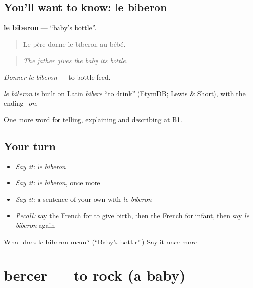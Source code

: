 \subsection*{You'll want to know: le biberon}
\textbf{le biberon} — \textquotedblleft{}baby's bottle\textquotedblright{}.

\begin{quote}
Le père donne le biberon au bébé.
\end{quote}

\begin{quote}
\emph{The father gives the baby its bottle.}
\end{quote}

\emph{Donner le biberon} — to bottle-feed.

\begin{cousinweb}
\emph{le biberon} is built on Latin \emph{bibere} \textquotedblleft{}to drink\textquotedblright{} (EtymDB; Lewis \& Short), with the ending \emph{-on}.
\end{cousinweb}

\begin{grammarlens}[title={What you've built}]
One more word for telling, explaining and describing at B1.
\end{grammarlens}

\subsection*{Your turn}
\begin{itemize}
\raggedright
  \item \emph{Say it:} \emph{le biberon}
  \item \emph{Say it:} \emph{le biberon}, once more
  \item \emph{Say it:} a sentence of your own with \emph{le biberon}
  \item \emph{Recall:} say the French for to give birth, then the French for infant, then say \emph{le biberon} again
\end{itemize}

\begin{tcolorbox}[breakable,colback=teal!4,colframe=teal!35!black,title={Before you move on}]
What does le biberon mean? (\textquotedblleft{}Baby's bottle\textquotedblright{}.) Say it once more.
\end{tcolorbox}
\section[bercer]{bercer — to rock (a baby)}

